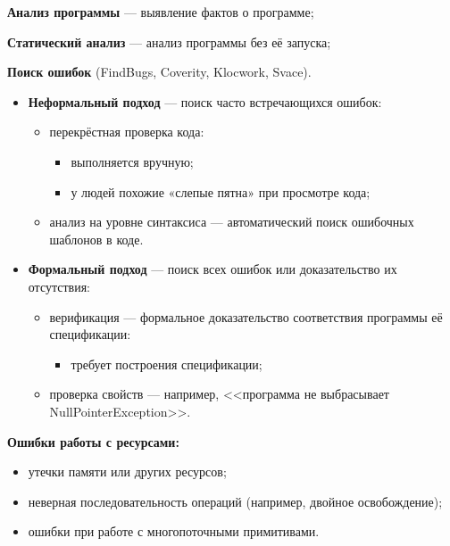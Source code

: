 
\textbf{Анализ программы} — выявление фактов о программе;

\textbf{Статический анализ} — анализ программы без её запуска;

\textbf{Поиск ошибок} (FindBugs, Coverity, Klocwork, Svace).

\begin{itemize}
    \item \textbf{Неформальный подход} — поиск часто встречающихся ошибок:
    \begin{itemize}
        \item перекрёстная проверка кода:
        \begin{itemize}
            \item выполняется вручную;
            \item у людей похожие «слепые пятна» при просмотре кода;
        \end{itemize}
        \item анализ на уровне синтаксиса — автоматический поиск ошибочных шаблонов в коде.
    \end{itemize}
    \item \textbf{Формальный подход} — поиск всех ошибок или доказательство их отсутствия:
    \begin{itemize}
        \item верификация — формальное доказательство соответствия программы её спецификации:
        \begin{itemize}
            \item требует построения спецификации;
        \end{itemize}
        \item проверка свойств — например, <<программа не выбрасывает NullPointerException>>.
    \end{itemize}
\end{itemize}

\textbf{Ошибки работы с ресурсами:}
\begin{itemize}
    \item утечки памяти или других ресурсов;
    \item  неверная последовательность операций (например, двойное освобождение);
    \item ошибки при работе с многопоточными примитивами.
\end{itemize}

